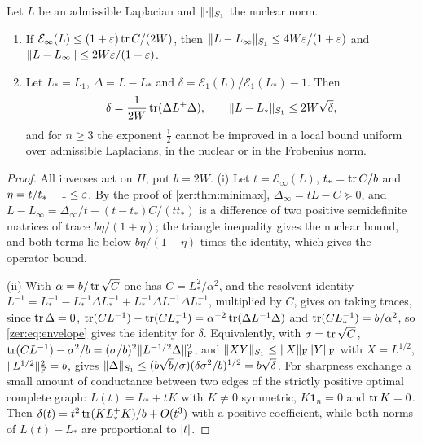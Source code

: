 \begin{proposition}\label{zer:prop:stability}
Let $L$ be an admissible Laplacian and $\lVert\cdot\rVert_{S_1}$ the nuclear norm.
\begin{enumerate}[label=\textup{(\roman*)}]
\item If $\mathcal E_\infty(L)\le(1+\varepsilon)\operatorname{tr} C/(2W)$, then
$\lVert L-L_\infty\rVert_{S_1}\le4W\varepsilon/(1+\varepsilon)$ and $\lVert L-L_\infty\rVert\le2W\varepsilon/(1+\varepsilon)$.
\item Let $L_*=L_1$, $\Delta=L-L_*$ and $\delta=\mathcal E_1(L)/\mathcal E_1(L_*)-1$. Then
\[
 \delta=\frac1{2W}\operatorname{tr}(\Delta L^+\Delta),\qquad\lVert L-L_*\rVert_{S_1}\le2W\sqrt\delta ,
\]
and for $n\ge3$ the exponent $\tfrac12$ cannot be improved in a local bound uniform over admissible
Laplacians, in the nuclear or in the Frobenius norm.
\end{enumerate}
\end{proposition}
\begin{proof}
All inverses act on $H$; put $b=2W$. (i) Let $t=\mathcal E_\infty(L)$, $t_*=\operatorname{tr} C/b$ and
$\eta=t/t_*-1\le\varepsilon$. By the proof of \cref{zer:thm:minimax}, $\Delta_\infty=tL-C\succeq0$, and
$L-L_\infty=\Delta_\infty/t-(t-t_*)C/(tt_*)$ is a difference of two positive semidefinite matrices of
trace $b\eta/(1+\eta)$; the triangle inequality gives the nuclear bound, and both terms lie below
$b\eta/(1+\eta)$ times the identity, which gives the operator bound.

(ii) With $\alpha=b/\operatorname{tr}\sqrt C$ one has $C=L_*^2/\alpha^2$, and the resolvent identity
$L^{-1}=L_*^{-1}-L_*^{-1}\Delta L_*^{-1}+L_*^{-1}\Delta L^{-1}\Delta L_*^{-1}$, multiplied by $C$, gives on
taking traces, since $\operatorname{tr}\Delta=0$,
$\operatorname{tr}(CL^{-1})-\operatorname{tr}(CL_*^{-1})=\alpha^{-2}\operatorname{tr}(\Delta L^{-1}\Delta)$ and $\operatorname{tr}(CL_*^{-1})=b/\alpha^2$, so
\eqref{zer:eq:envelope} gives the identity for $\delta$. Equivalently, with $\sigma=\operatorname{tr}\sqrt C$,
$\operatorname{tr}(CL^{-1})-\sigma^2/b=(\sigma/b)^2\lVert L^{-1/2}\Delta\rVert_{\mathrm F}^2$, and
$\lVert XY\rVert_{S_1}\le\lVert X\rVert_{\mathrm F}\lVert Y\rVert_{\mathrm F}$ with $X=L^{1/2}$, $\lVert L^{1/2}\rVert_{\mathrm F}^2=b$,
gives $\lVert\Delta\rVert_{S_1}\le(b\sqrt b/\sigma)(\delta\sigma^2/b)^{1/2}=b\sqrt\delta$. For sharpness exchange a
small amount of conductance between two edges of the strictly positive optimal complete graph:
$L(t)=L_*+tK$ with $K\ne0$ symmetric, $K\mathbf 1_n=0$ and $\operatorname{tr} K=0$. Then
$\delta(t)=t^2\operatorname{tr}(KL_*^+K)/b+O(t^3)$ with a positive coefficient, while both norms of $L(t)-L_*$ are
proportional to $\lvert t\rvert$.
\end{proof}

